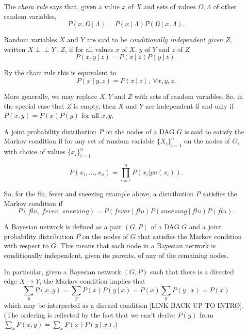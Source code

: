\documentclass[11pt, oneside]{article}   	%
\def\ci{\perp\!\!\!\perp}
\newcommand{\pablo}[1]{{\color{red}#1}}
\begin{document}
The \emph{chain rule} says that, given a value $x$ of $X$ and sets of values $\Omega, \Lambda$ of other random variables, 
\[ P(x, \Omega \ | \ \Lambda) = P( x \ | \ \Lambda) P( \Omega \ | \ x, \Lambda).\]

Random variables $X$ and $Y$ are said to be \emph{conditionally independent given $Z$}, written $X \ci Y \ | \ Z$, if for all values $x$ of $X$, $y$ of $Y$ and $z$ of $Z$
\[ P(x,y \ | \ z) = P(x \ | \ z) P(y \ | \ z).\]

By the chain rule this is equivalent to 
\[ P(x \ | \ y,z )  = P (x \ | \ z) , \ \forall x,y, z. \]

More generally, we may replace $X,Y$ and $Z$ with sets of random variables. So, in the special case that $Z$ is empty, then $X$ and $Y$ are independent if and only if $ P(x, y) = P(x)P(y)$ for all $x,y$.




A joint probability distribution $P$ on the nodes of a DAG $ G$ is said to satisfy the Markov condition if for any set of random variable $\{X_i\}_{i = 1}^n$ on the nodes of $G$, with choice of values $\{x_i\}_{i = 1}^n$

\[P(x_i, \dots, x_n) = \prod_{i = 1}^n P(x_i|{pa(x_i)}).\]

So, for the flu, fever and sneezing example above, a distribution $P$ satisfies the Markov condition if
\[ P(flu, \ fever, \ sneezing)  = P(fever \ | \ flu) P(sneezing \ | \ flu) P(flu).\]

A Bayesian network is defined as a pair $(G,P)$ of a DAG $G$ and a joint probability distribution $P$ on the nodes of $G$ that satisfies the Markov condition with respect to $G$. This means that each node in a Bayesian network is conditionally independent, given its parents, of any of the remaining nodes.

In particular, given a Bayesian network $(G,P)$ such that there is a directed edge $X \to Y$, the Markov condition implies that 
\[ \sum_{y} P(x,y) = \sum_y P(x) P(y \ | \ x) = P(x) \sum_y P(y \ | \ x)  = P(x)\] which may be interpreted as a discard condition [LINK BACK UP TO INTRO]. (The ordering is reflected by the fact that we can't derive $P(y)$ from $ \sum_{x} P(x,y) = \sum_x P(x) P(y \ | \ x) $.)

\end{document}
